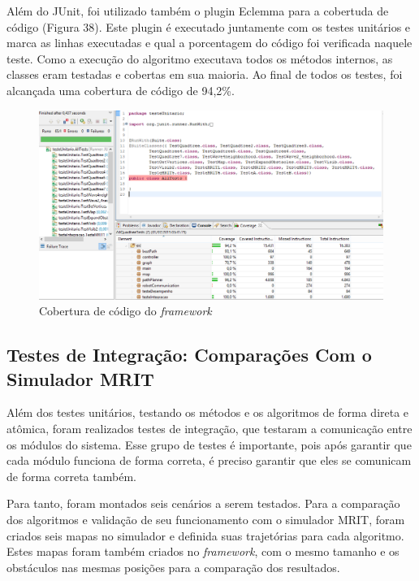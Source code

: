 Além do JUnit, foi utilizado também o plugin Eclemma para a cobertuda de código (Figura 38). Este plugin é executado juntamente com os testes unitários e marca as linhas executadas e qual a porcentagem do código foi verificada naquele teste. Como a execução do algoritmo executava todos os métodos internos, as classes eram testadas e cobertas em sua maioria. Ao final de todos os testes, foi alcançada uma cobertura de código de 94,2\%.

\begin{figure}[h]
	\centering
	\label{fig38}
		\includegraphics[keepaspectratio=true,scale=0.6]{figuras/cobertura.png}
	\caption{Cobertura de código do \textit{framework}}
\end{figure}

\subsection{Testes de Integração: Comparações Com o Simulador MRIT}

Além dos testes unitários, testando os métodos e os algoritmos de forma direta e atômica, foram realizados testes de integração, que testaram a comunicação entre os módulos do sistema. Esse grupo de testes é importante, pois após garantir que cada módulo funciona de forma correta, é preciso garantir que eles se comunicam de forma correta também.

Para tanto, foram montados seis cenários a serem testados. Para a comparação dos algoritmos e validação de seu funcionamento com o simulador MRIT, foram criados seis mapas no simulador e definida suas trajetórias para cada algoritmo. Estes mapas foram também criados no \textit{framework}, com o mesmo tamanho e os obstáculos nas mesmas posições para a comparação dos resultados.


